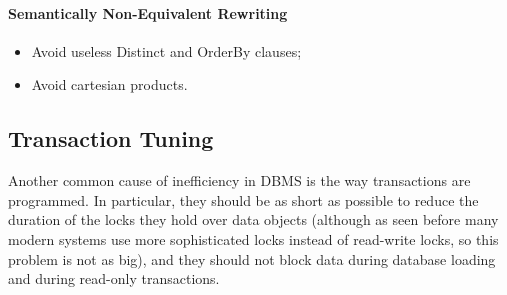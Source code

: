 \paragraph{Semantically Non-Equivalent Rewriting}
\begin{itemize}
    \item Avoid useless Distinct and OrderBy clauses;
    
    \item Avoid cartesian products.
\end{itemize}

\subsection{Transaction Tuning}

Another common cause of inefficiency in DBMS is the way transactions are programmed. In particular, they should be as short as possible to reduce the duration of the locks they hold over data objects (although as seen before many modern systems use more sophisticated locks instead of read-write locks, so this problem is not as big), and they should not block data during database loading and during read-only transactions.

